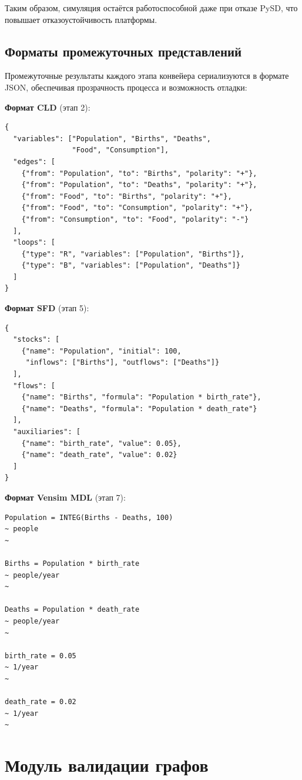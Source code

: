 Таким образом, симуляция остаётся работоспособной даже при отказе PySD, что повышает отказоустойчивость платформы.


\subsection{Форматы промежуточных представлений}

Промежуточные результаты каждого этапа конвейера сериализуются в формате JSON, обеспечивая прозрачность процесса и возможность отладки:

\textbf{Формат CLD} (этап 2):
\begin{lstlisting}[caption={Формат представления CLD}]
{
  "variables": ["Population", "Births", "Deaths",
                "Food", "Consumption"],
  "edges": [
    {"from": "Population", "to": "Births", "polarity": "+"},
    {"from": "Population", "to": "Deaths", "polarity": "+"},
    {"from": "Food", "to": "Births", "polarity": "+"},
    {"from": "Food", "to": "Consumption", "polarity": "+"},
    {"from": "Consumption", "to": "Food", "polarity": "-"}
  ],
  "loops": [
    {"type": "R", "variables": ["Population", "Births"]},
    {"type": "B", "variables": ["Population", "Deaths"]}
  ]
}
\end{lstlisting}

\textbf{Формат SFD} (этап 5):
\begin{lstlisting}[caption={Формат представления SFD}]
{
  "stocks": [
    {"name": "Population", "initial": 100,
     "inflows": ["Births"], "outflows": ["Deaths"]}
  ],
  "flows": [
    {"name": "Births", "formula": "Population * birth_rate"},
    {"name": "Deaths", "formula": "Population * death_rate"}
  ],
  "auxiliaries": [
    {"name": "birth_rate", "value": 0.05},
    {"name": "death_rate", "value": 0.02}
  ]
}
\end{lstlisting}

\textbf{Формат Vensim MDL} (этап 7):
\begin{lstlisting}[caption={Пример сгенерированного кода MDL}]
Population = INTEG(Births - Deaths, 100)
~ people
~

Births = Population * birth_rate
~ people/year
~

Deaths = Population * death_rate
~ people/year
~

birth_rate = 0.05
~ 1/year
~

death_rate = 0.02
~ 1/year
~
\end{lstlisting}


\section{Модуль валидации графов}

